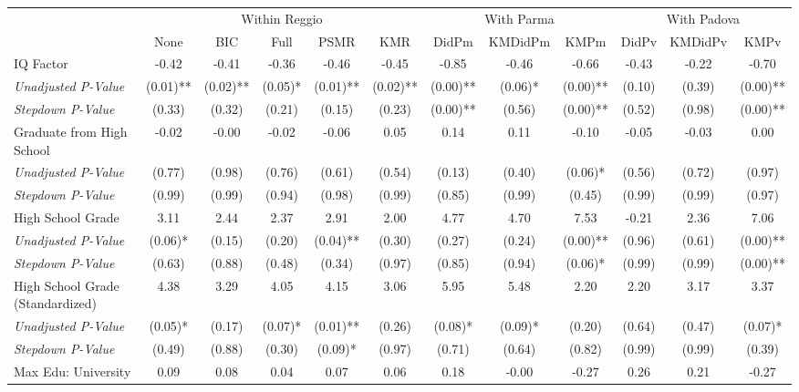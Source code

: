 \begin{tabular}{l c c c c c c c c c c c}
\toprule
& \multicolumn{5}{c}{Within Reggio} & \multicolumn{3}{c}{With Parma} & \multicolumn{3}{c}{With Padova} \\\cmidrule(lr){2-6} \cmidrule(lr){7-9} \cmidrule(lr){10-12}
 & None & BIC & Full & PSMR & KMR & DidPm & KMDidPm & KMPm & DidPv & KMDidPv & KMPv \\
\midrule
IQ Factor & -0.42 & -0.41 & -0.36 & -0.46 & -0.45 & -0.85 & -0.46 & -0.66 & -0.43 & -0.22 & -0.70 \\
\quad \textit{Unadjusted P-Value} & (0.01)** & (0.02)** & (0.05)* & (0.01)** & (0.02)** & (0.00)** & (0.06)* & (0.00)** & (0.10) & (0.39) & (0.00)** \\
\quad \textit{Stepdown P-Value} & (0.33) & (0.32) & (0.21) & (0.15) & (0.23) & (0.00)** & (0.56) & (0.00)** & (0.52) & (0.98) & (0.00)** \\
Graduate from High School & -0.02 & -0.00 & -0.02 & -0.06 & 0.05 & 0.14 & 0.11 & -0.10 & -0.05 & -0.03 & 0.00 \\
\quad \textit{Unadjusted P-Value} & (0.77) & (0.98) & (0.76) & (0.61) & (0.54) & (0.13) & (0.40) & (0.06)* & (0.56) & (0.72) & (0.97) \\
\quad \textit{Stepdown P-Value} & (0.99) & (0.99) & (0.94) & (0.98) & (0.99) & (0.85) & (0.99) & (0.45) & (0.99) & (0.99) & (0.97) \\
High School Grade & 3.11 & 2.44 & 2.37 & 2.91 & 2.00 & 4.77 & 4.70 & 7.53 & -0.21 & 2.36 & 7.06 \\
\quad \textit{Unadjusted P-Value} & (0.06)* & (0.15) & (0.20) & (0.04)** & (0.30) & (0.27) & (0.24) & (0.00)** & (0.96) & (0.61) & (0.00)** \\
\quad \textit{Stepdown P-Value} & (0.63) & (0.88) & (0.48) & (0.34) & (0.97) & (0.85) & (0.94) & (0.06)* & (0.99) & (0.99) & (0.00)** \\
High School Grade (Standardized) & 4.38 & 3.29 & 4.05 & 4.15 & 3.06 & 5.95 & 5.48 & 2.20 & 2.20 & 3.17 & 3.37 \\
\quad \textit{Unadjusted P-Value} & (0.05)* & (0.17) & (0.07)* & (0.01)** & (0.26) & (0.08)* & (0.09)* & (0.20) & (0.64) & (0.47) & (0.07)* \\
\quad \textit{Stepdown P-Value} & (0.49) & (0.88) & (0.30) & (0.09)* & (0.97) & (0.71) & (0.64) & (0.82) & (0.99) & (0.99) & (0.39) \\
Max Edu: University & 0.09 & 0.08 & 0.04 & 0.07 & 0.06 & 0.18 & -0.00 & -0.27 & 0.26 & 0.21 & -0.27 \\

\end{tabular}
